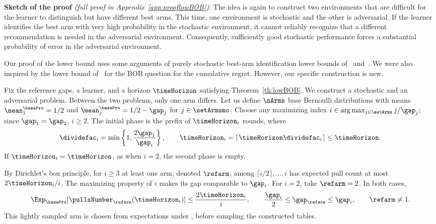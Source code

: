 %
%

\vspace{.5cm}
\noindent\textbf{Sketch of the proof} 
\textit{(full proof in 
	Appendix~\ref{app:prooflowBOB})}:
The idea is again to construct two environments that are difficult for the
learner to distinguish but have different best arms. This time, one environment
is stochastic and the other is adversarial. If the learner identifies the best
arm with very high probability in the stochastic environment, it cannot
reliably recognize that a different recommendation is needed in the
adversarial environment. Consequently, sufficiently good stochastic
performance forces a substantial probability of error in the adversarial
environment.

Our proof of the lower bound uses some arguments of purely stochastic best-arm identification 
lower bounds of~\cite{Audibert10BA} and~\cite{Carpentier16TB}.
We were also inspired by the lower bound of~\cite{Auer16AA} 
for the BOB question for the cumulative regret. However, 
our specific construction is new.

Fix the reference gaps, a learner, and a horizon $\timeHorizon$
satisfying Theorem~\ref{th:lowBOB}.
We construct a stochastic and an adversarial problem.
Between the two problems, only one arm differs.
Let us define $\nArms$ base Bernoulli distributions with means
$\mean_1^{\basePro}=1/2$ and
$\mean_j^{\basePro}=1/2-\gap_j$ for $j\in\setArmsmo$.
Choose any maximizing index
$i\in\arg\max_{j\in\setArms}j/\gap_j$; since $\gap_1=\gap_2$, $i\geq2$.
The initial phase is the prefix of $\timeHorizon_i$ rounds, where
\[
\dividefac_i=\min\left\{1,\frac{2\gap_1}{\gap_i}\right\},
\qquad
\timeHorizon_i=\left\lceil\timeHorizon\dividefac_i\right\rceil
\leq\timeHorizon.
\]
If $\timeHorizon_i=\timeHorizon$, as when $i=2$, the second phase is empty.

By Dirichlet's box principle, for $i\geq3$ at least one arm, denoted $\refarm$, among
$\lceil i/2\rceil,\ldots,i$ has expected pull count at most
$2\timeHorizon_i/i$. The maximizing property of $i$ makes its gap
comparable to $\gap_i$. For $i=2$, take $\refarm=2$. In both cases,
\[
\Exp_{\basePro}[\pullsNumber_{\refarm}(\timeHorizon_i)]
\leq\frac{2\timeHorizon_i}{i},\qquad
\frac{\gap_i}{2}\leq\gap_{\refarm}\leq\gap_i,\qquad\refarm\neq1.
\]
This lightly sampled arm is chosen from expectations under \basePro{},
before sampling the constructed tables.


